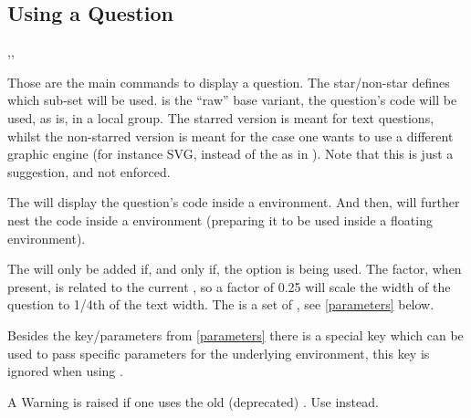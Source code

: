 \documentclass[10pt]{article}
\begin{document}
\subsection{Using a Question}\label{question use}
\begin{codedescribe}[code,update=2025/10/01]{\Question,\tikzQuestion,\ftikzQuestion}
\begin{codesyntax}%
\tsobj{\Question}
\tsobj{\tikzQuestion}
\tsobj{\ftikzQuestion}
\tsobj{\Question*}
\tsobj{\tikzQuestion*}
\tsobj{\ftikzQuestion*}
\end{codesyntax}
Those are the main commands to display a question. The star/non-star defines which sub-set  will be used. 
\tsobj{\Question} is the ``raw'' base variant, the question's code will be used, as is, in a local group. The starred version \tsobj{\Question*} is meant for text questions, whilst  the non-starred version \tsobj{\Question} is meant for the case one wants to use a different graphic engine (for instance SVG, instead of the  as in \tsobj{\tikzQuestion}). Note that this is just a suggestion, and not enforced.

The \tsobj{\tikzQuestion} will display the question's code inside a  environment. And then, \tsobj{\ftikzQuestion} will further nest the code inside a  environment (preparing it to be used inside a floating environment).

The  will only be added if, and only if, the  option is being used. The  factor, when present, is related to the current \tsobj{\textwidth}, so a factor of 0.25 will scale the width of the question to 1/4th of the text width. The  is a set of , see \ref{parameters} below.
\end{codedescribe}
\begin{tsremark}
  Besides the key/parameters from \ref{parameters} there is a special key  which can be used to pass  specific parameters for the underlying environment, this key is ignored when using \tsobj[code,sep=or]{\Question,\Question*}.
\end{tsremark}
\begin{tsremark}
  A Warning is raised if one uses the old (deprecated) \tsobj[code,sep=or]{\rawtikzQuestion,\textQuestion}. Use \tsobj{\Question} instead.
\end{tsremark}
\end{document}
